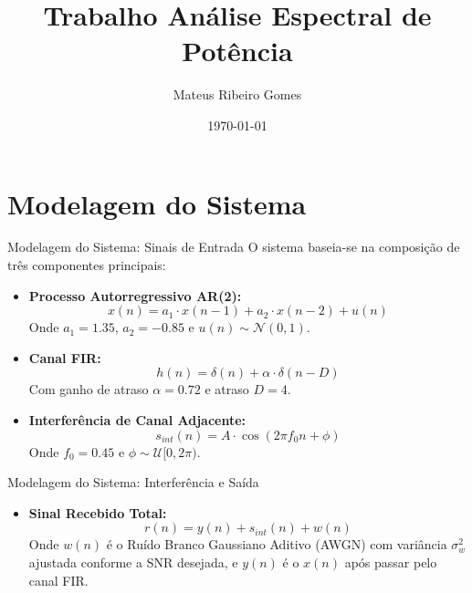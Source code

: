 \documentclass[10pt]{beamer}
\title[Processo Estocásticos II]{Trabalho Análise Espectral de Potência}
\author{Mateus Ribeiro Gomes}
\date{\today}
\begin{document}
\begin{frame}
    \titlepage
\end{frame}

\section{Modelagem do Sistema}

\begin{frame}{Modelagem do Sistema: Sinais de Entrada}
    O sistema baseia-se na composição de três componentes principais:
    \vfill
    \begin{itemize}
        \item \textbf{Processo Autorregressivo AR(2):}
        \begin{equation*}
            x(n) = a_1 \cdot x(n-1) + a_2 \cdot x(n-2) + u(n)
        \end{equation*}
        Onde $a_1 = 1.35$, $a_2 = -0.85$ e $u(n) \sim \mathcal{N}(0, 1)$.
        
        \item \textbf{Canal FIR:}
        \begin{equation*}
            h(n) = \delta(n) + \alpha \cdot \delta (n-D)
        \end{equation*}
        Com ganho de atraso $\alpha = 0.72$ e atraso $D = 4$.
        \item \textbf{Interferência de Canal Adjacente:}
        \begin{equation*}
            s_{int}(n) = A \cdot \cos(2 \pi f_0 n + \phi)
        \end{equation*}
            Onde $f_0 = 0.45$ e $\phi \sim \mathcal{U}[0, 2\pi)$.
        
    \end{itemize}
\end{frame}

\begin{frame}{Modelagem do Sistema: Interferência e Saída}
    \begin{itemize}
        \item \textbf{Sinal Recebido Total:}
        \begin{equation*}
            r(n) = y(n) + s_{int}(n) + w(n)
        \end{equation*}
            Onde $w(n)$ é o Ruído Branco Gaussiano Aditivo (AWGN) com variância $\sigma_w^2$ ajustada conforme a SNR desejada, e $y(n)$ é o $x(n)$ após
            passar pelo canal FIR.
    \end{itemize}
\end{frame}
\end{document}
